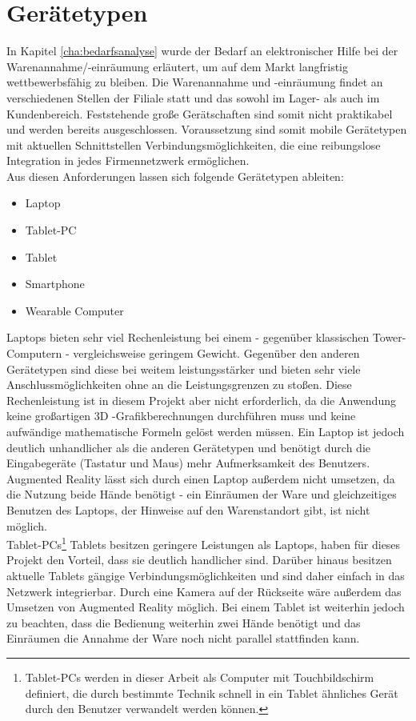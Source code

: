 \section{Gerätetypen}
\label{sec:geraete}
In Kapitel \ref{cha:bedarfsanalyse}  wurde der Bedarf an elektronischer Hilfe bei der Warenannahme/-einräumung erläutert, um auf dem Markt langfristig wettbewerbsfähig zu bleiben. Die Warenannahme und -einräumung findet an verschiedenen Stellen der Filiale statt und das sowohl im Lager- als auch im Kundenbereich. Feststehende große Gerätschaften sind somit nicht praktikabel und werden bereits ausgeschlossen. Voraussetzung sind somit mobile Gerätetypen mit aktuellen Schnittstellen \bzw Verbindungsmöglichkeiten, die eine reibungslose Integration in jedes Firmennetzwerk ermöglichen.\\
Aus diesen Anforderungen lassen sich folgende Gerätetypen ableiten:
\begin{itemize}
	\item Laptop
	\item Tablet-PC
	\item Tablet
	\item Smartphone
	\item Wearable Computer
\end{itemize}
Laptops bieten sehr viel Rechenleistung bei einem - gegenüber klassischen Tower-Computern - vergleichsweise geringem Gewicht. Gegenüber den anderen Gerätetypen sind diese bei weitem leistungsstärker und bieten sehr viele Anschlussmöglichkeiten ohne an die Leistungsgrenzen zu stoßen. Diese Rechenleistung ist in diesem Projekt aber nicht erforderlich, da die Anwendung keine großartigen \ac{3D} -Grafikberechnungen durchführen muss und keine aufwändige mathematische Formeln gelöst werden müssen. Ein Laptop ist jedoch deutlich unhandlicher als die anderen Gerätetypen und benötigt durch die Eingabegeräte (Tastatur und Maus) mehr Aufmerksamkeit des Benutzers. Augmented Reality lässt sich durch einen Laptop außerdem nicht umsetzen, da die Nutzung beide Hände benötigt - ein Einräumen der Ware und gleichzeitiges Benutzen des Laptops, der Hinweise auf den Warenstandort gibt, ist nicht möglich.\\

Tablet-PCs\footnote{Tablet-PCs werden in dieser Arbeit als Computer mit Touchbildschirm definiert, die durch bestimmte Technik schnell in ein Tablet ähnliches Gerät durch den Benutzer verwandelt werden können.} \bzw Tablets besitzen geringere Leistungen als Laptops, haben für dieses Projekt den Vorteil, dass sie deutlich handlicher sind. Darüber hinaus besitzen aktuelle Tablets gängige Verbindungsmöglichkeiten und sind daher einfach in das Netzwerk integrierbar. Durch eine Kamera auf der Rückseite wäre außerdem das Umsetzen von Augmented Reality möglich. Bei einem Tablet ist weiterhin jedoch zu beachten, dass die Bedienung weiterhin zwei Hände benötigt und das Einräumen \bzw die Annahme der Ware noch nicht parallel stattfinden kann.\\

